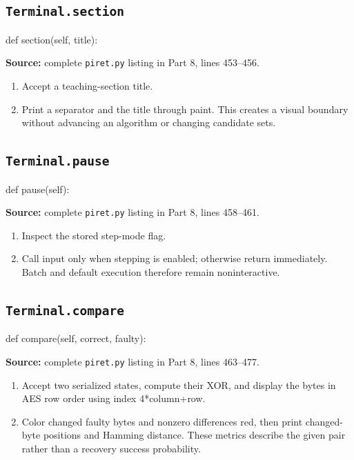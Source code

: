 \subsection{\texttt{Terminal.section}}
\begin{lightcode}
def section(self, title):
\end{lightcode}
\noindent\textbf{Source:} complete \texttt{piret.py} listing in Part 8, lines 453--456.
\begin{enumerate}
\item Accept a teaching-section title.
\item Print a separator and the title through paint. This creates a visual boundary without advancing an algorithm or changing candidate sets.
\end{enumerate}
\subsection{\texttt{Terminal.pause}}
\begin{lightcode}
def pause(self):
\end{lightcode}
\noindent\textbf{Source:} complete \texttt{piret.py} listing in Part 8, lines 458--461.
\begin{enumerate}
\item Inspect the stored step-mode flag.
\item Call input only when stepping is enabled; otherwise return immediately. Batch and default execution therefore remain noninteractive.
\end{enumerate}
\subsection{\texttt{Terminal.compare}}
\begin{lightcode}
def compare(self, correct, faulty):
\end{lightcode}
\noindent\textbf{Source:} complete \texttt{piret.py} listing in Part 8, lines 463--477.
\begin{enumerate}
\item Accept two serialized states, compute their XOR, and display the bytes in AES row order using index 4*column+row.
\item Color changed faulty bytes and nonzero differences red, then print changed-byte positions and Hamming distance. These metrics describe the given pair rather than a recovery success probability.
\end{enumerate}
